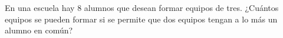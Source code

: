 En una escuela hay $8$ alumnos que desean formar equipos de tres. ¿Cuántos equipos se pueden formar si se permite que dos equipos tengan a lo más un alumno en común?